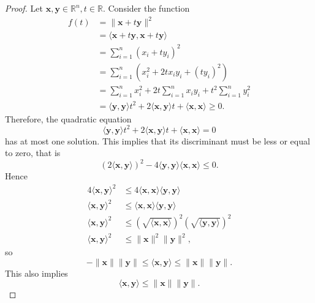 \documentclass{article}
\theoremstyle{plain}
\begin{document}
\begin{proof}
  Let
  \begin{math}
    \bm{x} , \bm{y} \in \mathbb{R}^n , t \in \mathbb{R} .
  \end{math}
  Consider the function
  \begin{equation*}
    \begin{split}
      f(t) &= \lVert \bm{x} + t \bm{y} \rVert^2 \\
      &= \langle \bm{x} + t \bm{y} , \bm{x} + t \bm{y} \rangle \\
      &= \sum_{i=1}^n (x_i + t y_i)^2 \\
      &= \sum_{i=1}^n \left(x_i^2 + 2 t x_i y_i + (t y_i)^2\right) \\
      &= \sum_{i=1}^n x_i^2 + 2 t \sum_{i=1}^n x_i y_i + t^2 \sum_{i=1}^n y_i^2 \\
      &= \langle \bm{y} , \bm{y} \rangle t^2 + 2 \langle \bm{x} , \bm{y} \rangle t + \langle \bm{x} , \bm{x} \rangle \geq 0 .
    \end{split}
  \end{equation*}
  Therefore, the quadratic equation
  \begin{equation*}
    \langle \bm{y} , \bm{y} \rangle t^2 + 2 \langle \bm{x} , \bm{y} \rangle t + \langle \bm{x} , \bm{x} \rangle = 0
  \end{equation*}
  has at most one solution. This implies that its discriminant must be less or equal to zero, that is
  \begin{equation*}
    (2 \langle \bm{x} , \bm{y} \rangle)^2 - 4 \langle \bm{y} , \bm{y} \rangle \langle \bm{x} , \bm{x} \rangle \leq 0 .
  \end{equation*}
  Hence
  \begin{equation*}
    \begin{split}
      4 \langle \bm{x} , \bm{y} \rangle^2 &\leq 4 \langle \bm{x} , \bm{x} \rangle \langle \bm{y} , \bm{y} \rangle \\
      \langle \bm{x} , \bm{y} \rangle^2 &\leq \langle \bm{x} , \bm{x} \rangle \langle \bm{y} , \bm{y} \rangle \\
      \langle \bm{x} , \bm{y} \rangle^2 &\leq \left(\sqrt{\langle \bm{x} , \bm{x} \rangle}\right)^2 \left(\sqrt{\langle \bm{y} , \bm{y} \rangle}\right)^2 \\
      \langle \bm{x} , \bm{y} \rangle^2 &\leq \lVert \bm{x} \rVert^2 \lVert \bm{y} \rVert^2 ,
    \end{split}
  \end{equation*}
  so
  \begin{equation*}
    - \lVert \bm{x} \rVert \lVert \bm{y} \rVert \leq \langle \bm{x} , \bm{y} \rangle \leq \lVert \bm{x} \rVert \lVert \bm{y} \rVert .
  \end{equation*}
  This also implies
  \begin{equation*}
    \langle \bm{x} , \bm{y} \rangle \leq \lVert \bm{x} \rVert \lVert \bm{y} \rVert .
  \end{equation*}
\end{proof}
\end{document}
